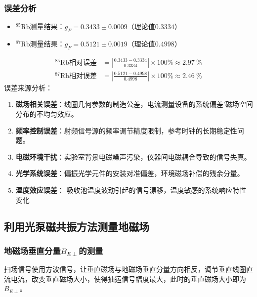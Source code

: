 \subsubsection{误差分析}

\begin{itemize}[leftmargin=2em]
    \item ${}^{85}\text{Rb}$测量结果：$g_F = 0.3433 \pm 0.0009$（理论值$0.3334$）
    \item ${}^{87}\text{Rb}$测量结果：$g_F = 0.5121 \pm 0.0019$（理论值$0.4998$）
\end{itemize}
\begin{align*}
    \text{${}^{85}\text{Rb}$相对误差} &= \left|\frac{0.3433 - 0.3334}{0.3334}\right| \times 100\% \approx \SI{2.97}{\percent} \\
    \text{${}^{87}\text{Rb}$相对误差} &= \left|\frac{0.5121 - 0.4998}{0.4998}\right| \times 100\% \approx \SI{2.46}{\percent}
\end{align*}
误差来源分析：
\begin{enumerate}
    \item \textbf{磁场相关误差}：线圈几何参数的制造公差，电流测量设备的系统偏差’磁场空间分布的不均匀效应。
  
    
    \item \textbf{频率控制误差}：射频信号源的频率调节精度限制，参考时钟的长期稳定性问题。
    
    
    \item \textbf{电磁环境干扰}：实验室背景电磁噪声污染，仪器间电磁耦合导致的信号失真。
   
    \item \textbf{光学系统误差}：偏振光学元件的安装对准偏差，环境磁场补偿的残余分量。
   
    
    \item \textbf{温度效应误差}： 吸收池温度波动引起的信号漂移，温度敏感的系统响应特性变化
\end{enumerate}


\subsection{利用光泵磁共振方法测量地磁场}


\subsubsection{地磁场垂直分量$B_{E\perp}$的测量}

扫场信号使用方波信号，让垂直磁场与地磁场垂直分量方向相反，调节垂直线圈直流电流，改变垂直磁场大小，使得抽运信号幅度最大，此时的垂直磁场大小即为$B_{E\perp}$。

